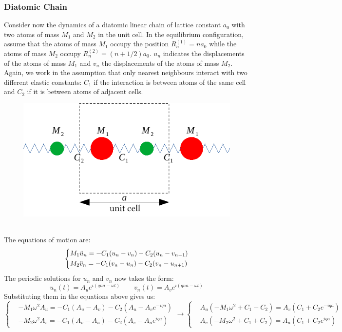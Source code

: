 \documentclass[10.75pt,a4paper,openright,bottom=2cm]{article}
\begin{document}
\subsubsection{Diatomic Chain}
Consider now the dynamics of a diatomic linear chain of lattice constant $a_0$ with two atoms of mass $M_1$ and $M_2$ in the unit cell. In the equilibrium configuration, assume that the atoms of mass $M_1$ occupy the position $R_n^{(1)}=na_0$ while the atoms of mass $M_2$ occupy $R_n^{(2)}=(n+1/2)a_0$. $u_n$ indicates the displacements of the atoms of mass $M_1$ and $v_n$ the displacements of the atoms of mass $M_2$. Again, we work in the assumption that only nearest neighbours interact with two different elastic constants: $C_1$ if the interaction is between atoms of the same cell and $C_2$ if it is between atoms of adjacent cells.
\begin{figure}[h]
    \centering
    \includegraphics{diatomic_chain.pdf}
    \caption*{}
    \label{fig:diatomic_chain}
\end{figure}\\
\noindent
The equations of motion are:
\[
\left\{
\begin{aligned}
&M_1\Ddot{u}_n=-C_1(u_n-v_n)-C_2(u_n-v_{n-1})\\
&M_2\Ddot{v}_n=-C_1(v_n-u_n)-C_2(v_n-u_{n+1})
\end{aligned}
\right.
\]
The periodic solutions for $u_n$ and $v_n$ now takes the form:
\[
u_n(t)=A_ue^{i(qna-\omega t)} \qquad v_n(t)=A_ve^{i(qna-\omega t)}
\]
Substituting them in the equations above gives us:
\[
\left\{
\begin{aligned}
&-M_1\omega^2A_u=-C_1(A_u-A_v)-C_2(A_u-A_ve^{-iqa})\\
&-M_2\omega^2A_v=-C_1(A_v-A_u)-C_2(A_v-A_ue^{iqa})
\end{aligned}
\right.
\to
\left\{
\begin{aligned}
&A_u(-M_1\omega^2+C_1+C_2)=A_v(C_1+C_2e^{-iqa})\\
&A_v(-M_2\omega^2+C_1+C_2)=A_u(C_1+C_2e^{iqa})
\end{aligned}
\right.
\]
\end{document}
